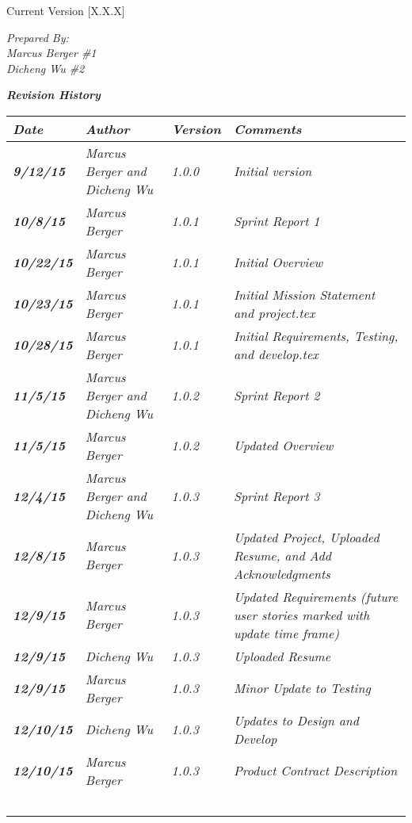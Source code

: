 


Current Version [X.X.X]
\vspace*{5mm}

{\color{SDColor5}
\noindent
\textit{Prepared By:}\\
\textit{Marcus Berger \#1}\\
\textit{Dicheng Wu \#2}\\
}

\vfill
\noindent
{\color{SDColor3} \textit{\textbf{Revision History}}}\\
\begin{tabular}{|>{\raggedright}p{1.5cm}|>{\raggedright}p{3cm}|>{\raggedright}p{1.5cm}|>{\raggedright}p{9cm}|}
\hline
\textit{\textbf{Date}} &  \textit{\textbf{Author}} & \textit{\textbf{Version}} & \textit{\textbf{Comments}}\tabularnewline
\hline
 \textit{\textbf{9/12/15}} & \textit{Marcus Berger and Dicheng Wu} & \textit{1.0.0} & \textit{Initial version}\tabularnewline
\hline
\textit{\textbf{10/8/15}} & \textit{Marcus Berger} & \textit{1.0.1} & \textit{Sprint Report 1}\tabularnewline
\hline
\textit{\textbf{10/22/15}} & \textit{Marcus Berger} & \textit{1.0.1} & \textit{Initial Overview}\tabularnewline
\hline
\textit{\textbf{10/23/15}} & \textit{Marcus Berger} & \textit{1.0.1} & \textit{Initial Mission Statement and project.tex}\tabularnewline
\hline
\textit{\textbf{10/28/15}} & \textit{Marcus Berger} & \textit{1.0.1} & \textit{Initial Requirements, Testing, and develop.tex }\tabularnewline
\hline
\textit{\textbf{11/5/15}} & \textit{Marcus Berger and Dicheng Wu} & \textit{1.0.2} & \textit{Sprint Report 2}\tabularnewline
\hline
\textit{\textbf{11/5/15}} & \textit{Marcus Berger} & \textit{1.0.2} & \textit{Updated Overview}\tabularnewline
\hline
\textit{\textbf{12/4/15}} & \textit{Marcus Berger and Dicheng Wu} & \textit{1.0.3} & \textit{Sprint Report 3}\tabularnewline
\hline
\textit{\textbf{12/8/15}} & \textit{Marcus Berger} & \textit{1.0.3} & \textit{Updated Project, Uploaded Resume, and Add Acknowledgments}\tabularnewline
\hline
\textit{\textbf{12/9/15}} & \textit{Marcus Berger} & \textit{1.0.3} & \textit{Updated Requirements (future user stories marked with update time frame) }\tabularnewline
\hline
\textit{\textbf{12/9/15}} & \textit{Dicheng Wu} & \textit{1.0.3} & \textit{Uploaded Resume}\tabularnewline
\hline
\textit{\textbf{12/9/15}} & \textit{Marcus Berger} & \textit{1.0.3} & \textit{Minor Update to Testing}\tabularnewline
\hline
\textit{\textbf{12/10/15}} & \textit{Dicheng Wu} & \textit{1.0.3} & \textit{Updates to Design and Develop}\tabularnewline
\hline
\textit{\textbf{12/10/15}} & \textit{Marcus Berger} & \textit{1.0.3} & \textit{Product Contract Description}\tabularnewline
\hline
 &  &  & \tabularnewline
 \hline
 &  &  & \tabularnewline
\hline
 &  &  & \tabularnewline
\hline
 &  &  & \tabularnewline
\hline
 &  &  & \tabularnewline
\hline
\end{tabular}
\vfill

